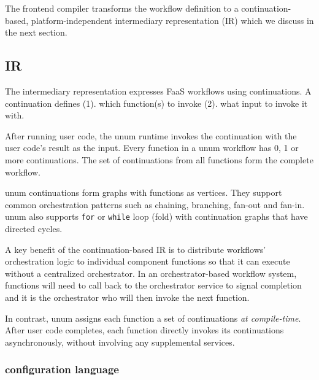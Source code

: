 The frontend compiler transforms the workflow definition to a
continuation-based, platform-independent intermediary representation (IR)
which we discuss in the next section.



\subsection{\name{} IR}\label{sec:design-ir}

The \name{} intermediary representation expresses FaaS workflows using
continuations. A continuation defines (1). which function(s) to invoke (2).
what input to invoke it with.

After running user code, the unum runtime invokes the continuation with the
user code's result as the input. Every function in a unum workflow has 0, 1 or
more continuations. The set of continuations from all functions form the
complete workflow.

unum continuations form graphs with functions as vertices. They support common
orchestration patterns such as chaining, branching, fan-out and fan-in. unum
also supports \texttt{for} or \texttt{while} loop (fold) with continuation
graphs that have directed cycles.

A key benefit of the continuation-based IR is to distribute workflows'
orchestration logic to individual component functions so that it can execute
without a centralized orchestrator. In an orchestrator-based workflow system,
functions will need to call back to the orchestrator service to signal
completion and it is the orchestrator who will then invoke the next function.

In contrast, unum assigns each function a set of continuations \emph{at
compile-time}. After user code completes, each function directly invokes its
continuations asynchronously, without involving any supplemental services.





\subsubsection{\name{} configuration language}\label{sec:design-config-lang}

